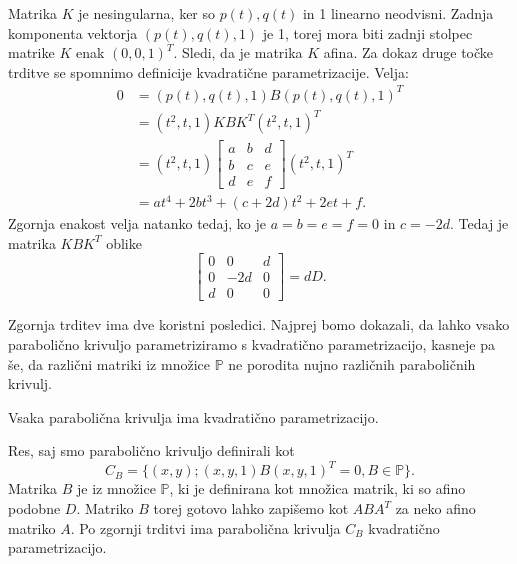 \documentclass[mat1]{fmfdelo}
\newcommand{\PP}{\mathbb P}
\begin{document}
\begin{dokaz}
Matrika $K$ je nesingularna, ker so $p(t), q(t)$ in 1 linearno neodvisni. Zadnja komponenta vektorja $(p(t), q(t), 1)$ je 1, torej mora biti zadnji stolpec matrike $K$ enak $(0,0,1)^T$. Sledi, da je matrika $K$ afina. Za dokaz druge točke trditve se spomnimo definicije kvadratične parametrizacije.
Velja:
\begin{align*}
0 &= (p(t), q(t), 1) B (p(t), q(t), 1)^T \\
   &= (t^2, t, 1) K B K^T (t^2, t, 1)^T \\
   &= (t^2, t, 1) 
\begin{bmatrix}
a & b & d \\
b & c & e \\
d & e & f
\end{bmatrix}
(t^2, t, 1)^T \\
   &= a t^4 + 2 b t^3 + (c+2d)t^2 + 2et + f
.\end{align*}
Zgornja enakost velja natanko tedaj, ko je $a=b=e=f=0$ in $c=-2d$. Tedaj je matrika $KBK^T$ oblike
$$
\begin{bmatrix}
0 & 0 & d \\
0 & -2d & 0 \\
d & 0 & 0
\end{bmatrix}
=
dD.
$$
\end{dokaz}

Zgornja trditev ima dve koristni posledici. Najprej bomo dokazali, da lahko vsako parabolično krivuljo parametriziramo s kvadratično parametrizacijo, kasneje pa še, da različni matriki iz množice $\PP$ ne porodita nujno različnih paraboličnih krivulj.

\begin{posledica}\label{vsakaparabola}
Vsaka parabolična krivulja ima kvadratično parametrizacijo.
\end{posledica}

\begin{dokaz}
Res, saj smo parabolično krivuljo definirali kot
$$ C_B = \{ (x,y); (x,y,1) B (x, y, 1)^T = 0, B \in \PP \}.$$
Matrika $B$ je iz množice $\PP$, ki je definirana kot množica matrik, ki so afino podobne $D$. Matriko $B$ torej gotovo lahko zapišemo kot $ABA^T$ za neko afino matriko $A$. Po zgornji trditvi ima parabolična krivulja $C_B$ kvadratično parametrizacijo.
\end{dokaz}

\end{document}
